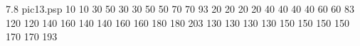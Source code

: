  7.8 pic13.psp 
{}{}{
 10 
 10 
 30 
 50 
 30 
 30 
 50 
 50 
 70 
 70 
 93 
 20 
 20 
 20 
 20 
 40 
 40 
 40 
 40 
 60 
 60 
 83 
 120 
 120 
 140 
 160 
 140 
 140 
 160 
 160 
 180 
 180 
 203 
 130 
 130 
 130 
 130 
 150 
 150 
 150 
 150 
 170 
 170 
 193 
}
